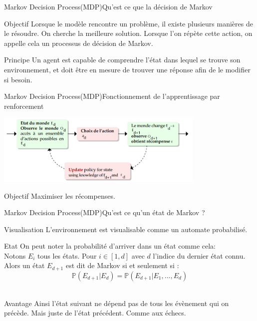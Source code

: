 
\begin{frame}{Markov Decision Process(MDP)}{Qu'est ce que la décision de Markov}
	\begin{center}
		\begin{block}{Objectif}
			Lorsque le modèle rencontre un problème, il existe plusieurs manières de le résoudre. On cherche la meilleure solution. Lorsque l'on répète cette action, on appelle cela un processus de décision de Markov. 
		\end{block}
		\begin{block}{Principe}
			Un agent est capable de comprendre l’état dans lequel se trouve son environnement, et doit être en mesure de trouver une réponse afin de le modifier si besoin.
		\end{block}
	\end{center}
\end{frame}
\begin{frame}{Markov Decision Process(MDP)}{Fonctionnement de l'apprentissage par renforcement}
	\begin{center}
		\includegraphics[width=10cm]{ressources/MDP/Fonctionnement.jpg}
	\end{center}
	\begin{block}{Objectif}
		Maximiser les récompenses.
	\end{block}
\end{frame}
\begin{frame}{Markov Decision Process(MDP)}{Qu'est ce qu'un état de Markov ?}
	\begin{center}
		
		\begin{block}{Visualisation}
			L'environnement est visualisable comme un automate probabilisé.
		\end{block}
		\begin{block}{Etat}
			On peut noter la probabilité d'arriver dans un état comme cela:\\
			Notons $E_{i}$ tous les états. Pour $i \in [1,d]$ avec $d$ l'indice du dernier état connu.\\
			Alors un état $E_{d+1}$ est dit de Markov si et seulement si :\\ 
			$$\mathbb{P}(E_{d+1} | E_{d}) = \mathbb{P}(E_{d+1} | E_{1}, ..., E_{d})$$\\
		\end{block}
		\begin{block}{Avantage}
			Ainsi l'état suivant ne dépend pas de tous les évènement qui on précède. Mais juste de l'état précédent. Comme aux échecs.
		\end{block}
	\end{center}
\end{frame}
